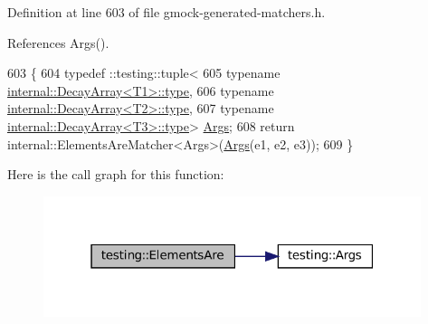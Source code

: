 Definition at line 603 of file gmock-\/generated-\/matchers.\+h.



References Args().


\begin{DoxyCode}
603                                                       \{
604   typedef ::testing::tuple<
605       \textcolor{keyword}{typename} \hyperlink{namespacegenerate__debs_a50bc9a7ecac9584553e089a448bcde58}{internal::DecayArray<T1>::type},
606       \textcolor{keyword}{typename} \hyperlink{namespacegenerate__debs_a50bc9a7ecac9584553e089a448bcde58}{internal::DecayArray<T2>::type},
607       \textcolor{keyword}{typename} \hyperlink{namespacegenerate__debs_a50bc9a7ecac9584553e089a448bcde58}{internal::DecayArray<T3>::type}> 
      \hyperlink{namespacetesting_a09ac462e8d6ed468cbfaa9c767aee0aa}{Args};
608   \textcolor{keywordflow}{return} internal::ElementsAreMatcher<Args>(\hyperlink{namespacetesting_a09ac462e8d6ed468cbfaa9c767aee0aa}{Args}(e1, e2, e3));
609 \}
\end{DoxyCode}
Here is the call graph for this function\+:
\nopagebreak
\begin{figure}[H]
\begin{center}
\leavevmode
\includegraphics[width=313pt]{namespacetesting_a0be8a0ad5d7461fd1da13ecac4e21e2a_cgraph}
\end{center}
\end{figure}
\mbox{\label{namespacetesting_a4109ce480e0145bfce7c46120afb36d3}} 
